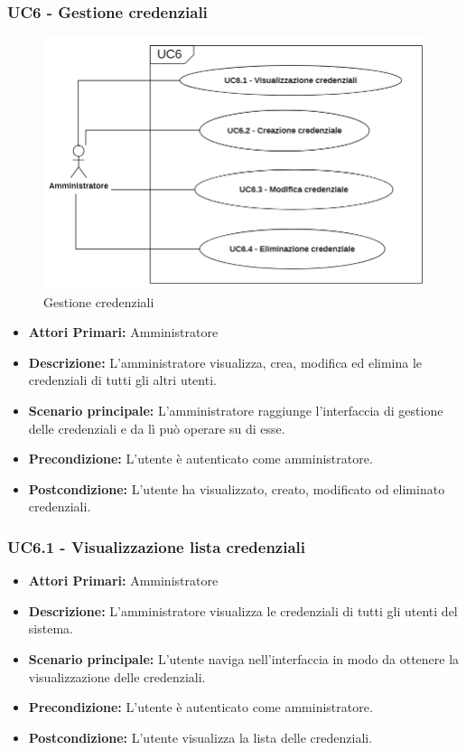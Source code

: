 \subsubsection{ UC6 - Gestione credenziali}
\begin{figure}[H]
	\centering
	\includegraphics[width=15cm]{res/images/UC6.png}
	\caption{Gestione credenziali}
	\label{fig:Gestione credenziali}
\end{figure}
\begin{itemize}
           	\item\textbf{Attori Primari:}
           	Amministratore
           	\item\textbf{Descrizione:} 
           	L'amministratore visualizza, crea, modifica ed elimina le credenziali di tutti gli altri utenti.
           	\item\textbf{Scenario principale:} 
           	L'amministratore raggiunge l'interfaccia di gestione delle credenziali e da lì può operare su di esse.
           	\item\textbf{Precondizione:} 
           	L'utente è autenticato come amministratore.
           	\item\textbf{Postcondizione:}
           	L'utente ha visualizzato, creato, modificato od eliminato credenziali.
\end{itemize}

\subsubsection{ UC6.1 - Visualizzazione lista credenziali}
\begin{itemize}
	\item\textbf{Attori Primari:} 
	Amministratore
	\item\textbf{Descrizione:} 
	L'amministratore visualizza le credenziali di tutti gli utenti del sistema.
	\item\textbf{Scenario principale:} 
	L'utente naviga nell'interfaccia in modo da ottenere la visualizzazione delle credenziali.
	\item\textbf{Precondizione:} 
	L'utente è autenticato come amministratore.
	\item\textbf{Postcondizione:}
	L'utente visualizza la lista delle credenziali.
\end{itemize}

